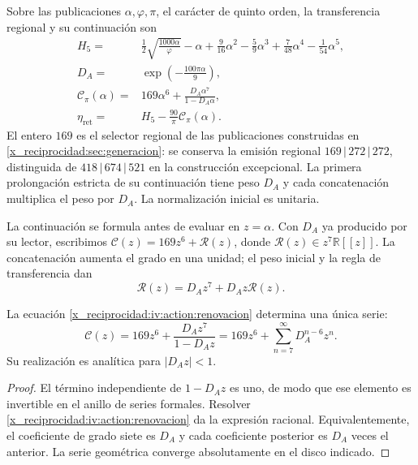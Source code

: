 \begin{definition}
\label{x_reciprocidad:iv:action:lectores}
Sobre las publicaciones \(\alpha,\varphi,\pi\), el carácter de
quinto orden, la transferencia regional y su continuación son
\begin{align}
 H_5={}&\frac12\sqrt{\frac{1000\alpha}{\varphi}}-\alpha
       +\frac9{16}\alpha^2-\frac59\alpha^3
       +\frac7{48}\alpha^4-\frac1{54}\alpha^5,
       \label{x_reciprocidad:iv:action:h5}\\
 D_A={}&\exp\!\left(-\frac{100\pi\alpha}{9}\right),
       \label{x_reciprocidad:iv:action:da}\\
 \mathcal C_\pi(\alpha)={}&169\alpha^6+
       \frac{D_A\alpha^7}{1-D_A\alpha},
       \label{x_reciprocidad:iv:action:cpi}\\
 \eta_{\mathrm{ret}}={}&H_5-\frac{90}{\pi}\mathcal C_\pi(\alpha).
       \label{x_reciprocidad:iv:action:eta-ret}
\end{align}
El entero \(169\) es el selector regional de las publicaciones
construidas en \ref{x_reciprocidad:sec:generacion}: se conserva la emisión regional
\(169\,|\,272\,|\,272\), distinguida de
\(418\,|\,674\,|\,521\) en la construcción excepcional.
La primera prolongación estricta de su continuación
tiene peso \(D_A\) y cada concatenación multiplica el peso por
\(D_A\). La normalización inicial es unitaria.
\end{definition}

La continuación se formula antes de evaluar en \(z=\alpha\).
Con \(D_A\) ya producido por su lector, escribimos
\(\mathscr C(z)=169z^6+\mathscr R(z)\), donde
\(\mathscr R(z)\in z^7\mathbb R[[z]]\).
La concatenación aumenta el grado en una unidad; el peso inicial
y la regla de transferencia dan
\begin{equation}
 \mathscr R(z)=D_Az^7+D_Az\mathscr R(z).
 \label{x_reciprocidad:iv:action:renovacion}
\end{equation}

\begin{proposition}
\label{x_reciprocidad:iv:action:unicidad-renovacion}
La ecuación \eqref{x_reciprocidad:iv:action:renovacion} determina una única serie:
\begin{equation}
 \mathscr C(z)=169z^6+\frac{D_Az^7}{1-D_Az}
             =169z^6+\sum_{n=7}^{\infty}D_A^{n-6}z^n.
 \label{x_reciprocidad:iv:action:serie-renovacion}
\end{equation}
Su realización es analítica para \(|D_Az|<1\).
\end{proposition}
\begin{proof}
El término independiente de \(1-D_Az\) es uno, de modo que ese
elemento es invertible en el anillo de series formales.
Resolver \eqref{x_reciprocidad:iv:action:renovacion} da la expresión racional.
Equivalentemente, el coeficiente de grado siete es \(D_A\) y cada
coeficiente posterior es \(D_A\) veces el anterior. La serie
geométrica converge absolutamente en el disco indicado.
\end{proof}


